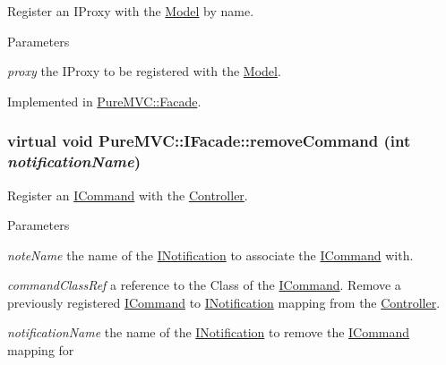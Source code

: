 Register an {\ttfamily IProxy} with the {\ttfamily \hyperlink{class_pure_m_v_c_1_1_model}{Model}} by name. 
\begin{DoxyParams}{Parameters}
\item[{\em proxy}]the {\ttfamily IProxy} to be registered with the {\ttfamily \hyperlink{class_pure_m_v_c_1_1_model}{Model}}. \end{DoxyParams}


Implemented in \hyperlink{class_pure_m_v_c_1_1_facade_ab075d59d3da686f0262900f4e19f22cd}{PureMVC::Facade}.\hypertarget{class_pure_m_v_c_1_1_i_facade_ab102e77651cb2340c3f7387b04dc38dd}{
\subsubsection[{removeCommand}]{\setlength{\rightskip}{0pt plus 5cm}virtual void PureMVC::IFacade::removeCommand (int {\em notificationName})}}
\label{class_pure_m_v_c_1_1_i_facade_ab102e77651cb2340c3f7387b04dc38dd}


Register an {\ttfamily \hyperlink{class_pure_m_v_c_1_1_i_command}{ICommand}} with the {\ttfamily \hyperlink{class_pure_m_v_c_1_1_controller}{Controller}}. 
\begin{DoxyParams}{Parameters}
\item[{\em noteName}]the name of the {\ttfamily \hyperlink{class_pure_m_v_c_1_1_i_notification}{INotification}} to associate the {\ttfamily \hyperlink{class_pure_m_v_c_1_1_i_command}{ICommand}} with. \item[{\em commandClassRef}]a reference to the {\ttfamily Class} of the {\ttfamily \hyperlink{class_pure_m_v_c_1_1_i_command}{ICommand}}. Remove a previously registered {\ttfamily \hyperlink{class_pure_m_v_c_1_1_i_command}{ICommand}} to {\ttfamily \hyperlink{class_pure_m_v_c_1_1_i_notification}{INotification}} mapping from the \hyperlink{class_pure_m_v_c_1_1_controller}{Controller}.\item[{\em notificationName}]the name of the {\ttfamily \hyperlink{class_pure_m_v_c_1_1_i_notification}{INotification}} to remove the {\ttfamily \hyperlink{class_pure_m_v_c_1_1_i_command}{ICommand}} mapping for \end{DoxyParams}


